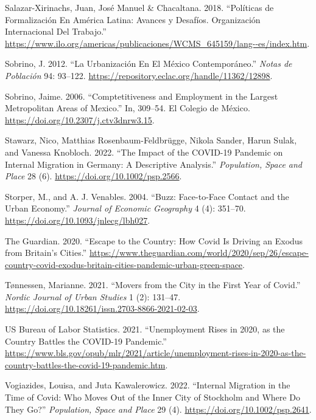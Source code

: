 \documentclass[11pt,letterpaper]{article}
\newlength{\cslhangindent}
\newlength{\cslentryspacingunit} %
\newenvironment{CSLReferences}[2] %
 {%
  \setlength{\parindent}{0pt}
  \ifodd #1
  \let\oldpar\par
  \def\par{\hangindent=\cslhangindent\oldpar}
  \fi
  \setlength{\parskip}{#2\cslentryspacingunit}
 }%
 {}
\begin{document}
\begin{CSLReferences}{1}{0}
Salazar-Xirinachs, Juan, José Manuel \& Chacaltana. 2018. {``Políticas
de Formalización En América Latina: Avances y Desafíos. Organización
Internacional Del Trabajo.''}
\url{https://www.ilo.org/americas/publicaciones/WCMS_645159/lang--es/index.htm}.

Sobrino, J. 2012. {``La Urbanización En El México Contemporáneo.''}
\emph{Notas de Población} 94: 93--122.
\url{https://repository.eclac.org/handle/11362/12898}.

Sobrino, Jaime. 2006. {``Comptetitiveness and Employment in the Largest
Metropolitan Areas of Mexico.''} In, 309--54. El Colegio de México.
\url{https://doi.org/10.2307/j.ctv3dnrw3.15}.

Stawarz, Nico, Matthias Rosenbaum-Feldbrügge, Nikola Sander, Harun
Sulak, and Vanessa Knobloch. 2022. {``The Impact of the COVID{-}19
Pandemic on Internal Migration in Germany: A Descriptive Analysis.''}
\emph{Population, Space and Place} 28 (6).
\url{https://doi.org/10.1002/psp.2566}.

Storper, M., and A. J. Venables. 2004. {``Buzz: Face-to-Face Contact and
the Urban Economy.''} \emph{Journal of Economic Geography} 4 (4):
351--70. \url{https://doi.org/10.1093/jnlecg/lbh027}.

The Guardian. 2020. {``Escape to the Country: How Covid Is Driving an
Exodus from Britain's Cities.''}
\url{https://www.theguardian.com/world/2020/sep/26/escape-country-covid-exodus-britain-cities-pandemic-urban-green-space}.

Tønnessen, Marianne. 2021. {``Movers from the City in the First Year of
Covid.''} \emph{Nordic Journal of Urban Studies} 1 (2): 131--47.
\url{https://doi.org/10.18261/issn.2703-8866-2021-02-03}.

US Bureau of Labor Statistics. 2021. {``Unemployment Rises in 2020, as
the Country Battles the COVID-19 Pandemic.''}
\url{https://www.bls.gov/opub/mlr/2021/article/unemployment-rises-in-2020-as-the-country-battles-the-covid-19-pandemic.htm}.

Vogiazides, Louisa, and Juta Kawalerowicz. 2022. {``Internal Migration
in the Time of Covid: Who Moves Out of the Inner City of Stockholm and
Where Do They Go?''} \emph{Population, Space and Place} 29 (4).
\url{https://doi.org/10.1002/psp.2641}.


\end{CSLReferences}
\end{document}
